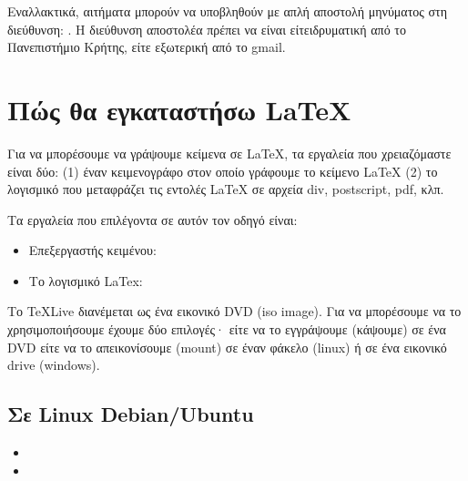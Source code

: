 \documentclass[letterpaper,10pt,greek]{sphinxhowto}
\begin{document}
\sphinxAtStartPar
Εναλλακτικά, αιτήματα μπορούν να υποβληθούν με απλή αποστολή
μηνύματος στη διεύθυνση: .
Η διεύθυνση αποστολέα πρέπει να είναι είτειδρυματική από το
Πανεπιστήμιο Κρήτης, είτε εξωτερική από το gmail.

\sphinxstepscope


\section{Πώς θα εγκαταστήσω LaTeX}
\label{\detokenize{HowToInstallLaTeX:latex}}\label{\detokenize{HowToInstallLaTeX::doc}}
\sphinxAtStartPar
Για να μπορέσουμε να γράψουμε κείμενα σε LaTeΧ, τα εργαλεία που
χρειαζόμαστε είναι δύο: (1) έναν κειμενογράφο
στον οποίο γράφουμε το κείμενο LaTeX (2) το λογισμικό που μεταφράζει τις εντολές
LaTeX σε αρχεία div, postscript, pdf, κλπ.

\sphinxAtStartPar
Τα εργαλεία που επιλέγοντα σε αυτόν τον οδηγό είναι:
\begin{itemize}
\item {} 
\sphinxAtStartPar
Επεξεργαστής κειμένου: 

\item {} 
\sphinxAtStartPar
Το λογισμικό LaTex: 

\end{itemize}

\sphinxAtStartPar
Το TeXLive διανέμεται ως ένα εικονικό DVD (iso image). Για να μπορέσουμε
να το χρησιμοποιήσουμε έχουμε δύο επιλογές· είτε να το εγγράψουμε (κάψουμε)
σε ένα DVD είτε να το απεικονίσουμε (mount) σε έναν φάκελο (linux) ή σε
ένα εικονικό drive (windows).


\subsection{Σε Linux Debian/Ubuntu}
\label{\detokenize{HowToInstallLaTeX:linux-debian-ubuntu}}\begin{itemize}
\item {} 
\sphinxAtStartPar
{}

\item {} 
\sphinxAtStartPar
{}

\end{itemize}
\end{document}
